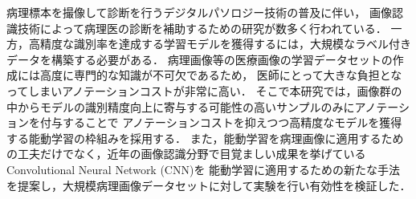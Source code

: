 病理標本を撮像して診断を行うデジタルパソロジー技術の普及に伴い，
画像認識技術によって病理医の診断を補助するための研究が数多く行われている．
一方，高精度な識別率を達成する学習モデルを獲得するには，大規模なラベル付きデータを構築する必要がある．
病理画像等の医療画像の学習データセットの作成には高度に専門的な知識が不可欠であるため，
医師にとって大きな負担となってしまいアノテーションコストが非常に高い．
そこで本研究では，画像群の中からモデルの識別精度向上に寄与する可能性の高いサンプルのみにアノテーションを付与することで
アノテーションコストを抑えつつ高精度なモデルを獲得する能動学習の枠組みを採用する．
また，能動学習を病理画像に適用するための工夫だけでなく，近年の画像認識分野で目覚ましい成果を挙げているConvolutional Neural Network (CNN)を
能動学習に適用するための新たな手法を提案し，大規模病理画像データセットに対して実験を行い有効性を検証した．
